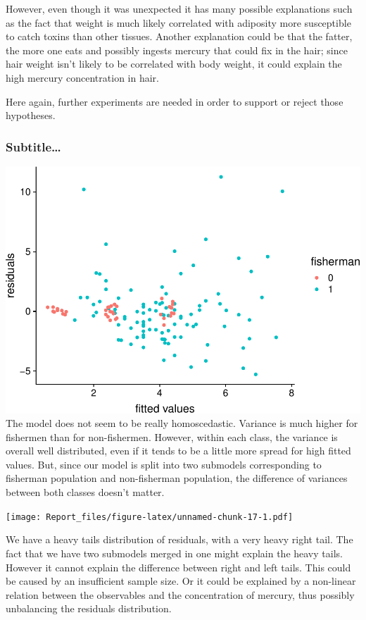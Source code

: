 \documentclass[12pt,]{article}
\begin{document}
However, even though it was unexpected it has many possible explanations
such as the fact that weight is much likely correlated with adiposity
more susceptible to catch toxins than other tissues. Another explanation
could be that the fatter, the more one eats and possibly ingests mercury
that could fix in the hair; since hair weight isn't likely to be
correlated with body weight, it could explain the high mercury
concentration in hair.

Here again, further experiments are needed in order to support or reject
those hypotheses.

\subsubsection{Subtitle\ldots{}}\label{subtitle}

\includegraphics{Report_files/figure-latex/unnamed-chunk-16-1.pdf} The
model does not seem to be really homoscedastic. Variance is much higher
for fishermen than for non-fishermen. However, within each class, the
variance is overall well distributed, even if it tends to be a little
more spread for high fitted values. But, since our model is split into
two submodels corresponding to fisherman population and non-fisherman
population, the difference of variances between both classes doesn't
matter.

\texttt{[image: Report\_files/figure-latex/unnamed-chunk-17-1.pdf]}

We have a heavy tails distribution of residuals, with a very heavy right
tail. The fact that we have two submodels merged in one might explain
the heavy tails. However it cannot explain the difference between right
and left tails. This could be caused by an insufficient sample size. Or
it could be explained by a non-linear relation between the observables
and the concentration of mercury, thus possibly unbalancing the
residuals distribution.
\end{document}
